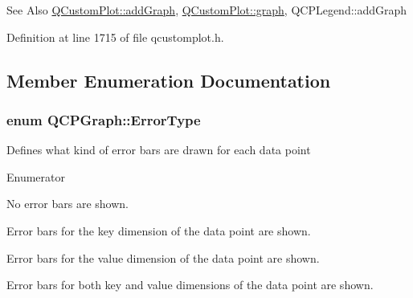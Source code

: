 \begin{DoxySeeAlso}{See Also}
\hyperlink{class_q_custom_plot_a6fb2873d35a8a8089842d81a70a54167}{Q\-Custom\-Plot\-::add\-Graph}, \hyperlink{class_q_custom_plot_a6d3ed93c2bf46ab7fa670d66be4cddaf}{Q\-Custom\-Plot\-::graph}, Q\-C\-P\-Legend\-::add\-Graph 
\end{DoxySeeAlso}


Definition at line 1715 of file qcustomplot.\-h.



\subsection{Member Enumeration Documentation}
\hypertarget{class_q_c_p_graph_ad23b514404bd2cb3216f57c90904d6af}{
\subsubsection[{Error\-Type}]{\setlength{\rightskip}{0pt plus 5cm}enum {\bf Q\-C\-P\-Graph\-::\-Error\-Type}}}\label{class_q_c_p_graph_ad23b514404bd2cb3216f57c90904d6af}
Defines what kind of error bars are drawn for each data point \begin{Desc}
\item[Enumerator]\par
\begin{description}
\item[{\em 
\hypertarget{class_q_c_p_graph_ad23b514404bd2cb3216f57c90904d6afaeae745e7cc1766bb8546e35d4b76a711}{et\-None}\label{class_q_c_p_graph_ad23b514404bd2cb3216f57c90904d6afaeae745e7cc1766bb8546e35d4b76a711}
}]No error bars are shown. \item[{\em 
\hypertarget{class_q_c_p_graph_ad23b514404bd2cb3216f57c90904d6afa2a5d89cd76fb8b6b18d71b8f6f6c0f43}{et\-Key}\label{class_q_c_p_graph_ad23b514404bd2cb3216f57c90904d6afa2a5d89cd76fb8b6b18d71b8f6f6c0f43}
}]Error bars for the key dimension of the data point are shown. \item[{\em 
\hypertarget{class_q_c_p_graph_ad23b514404bd2cb3216f57c90904d6afa147022ccdc49f6bd48f904cb4f61872e}{et\-Value}\label{class_q_c_p_graph_ad23b514404bd2cb3216f57c90904d6afa147022ccdc49f6bd48f904cb4f61872e}
}]Error bars for the value dimension of the data point are shown. \item[{\em 
\hypertarget{class_q_c_p_graph_ad23b514404bd2cb3216f57c90904d6afa761cb7d61670c1e2efecccd8974409ab}{et\-Both}\label{class_q_c_p_graph_ad23b514404bd2cb3216f57c90904d6afa761cb7d61670c1e2efecccd8974409ab}
}]Error bars for both key and value dimensions of the data point are shown. \end{description}
\end{Desc}


